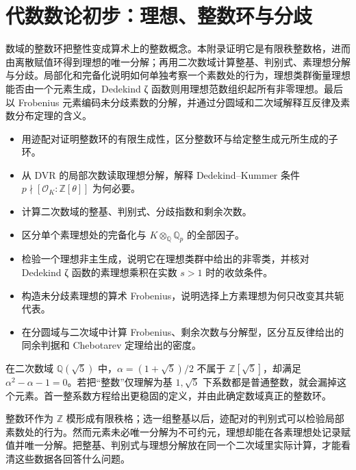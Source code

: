 
\chapter{代数数论初步：理想、整数环与分歧}
\label{b3:app:A}

\begin{chapterabstract}
	数域的整数环把整性变成算术上的整数概念。本附录证明它是有限秩整数格，进而由离散赋值环得到理想的唯一分解；再用二次数域计算整基、判别式、素理想分解与分歧。局部化和完备化说明如何单独考察一个素数处的行为，理想类群衡量理想能否由一个元素生成，Dedekind ζ 函数则用理想范数组织起所有非零理想。最后以 Frobenius 元素编码未分歧素数的分解，并通过分圆域和二次域解释互反律及素数分布定理的含义。
\end{chapterabstract}

\begin{learninggoals}
	\begin{itemize}
		\item 用迹配对证明整数环的有限生成性，区分整数环与给定整生成元所生成的子环。
		\item 从 DVR 的局部次数读取理想分解，解释 Dedekind--Kummer 条件 \(p\nmid[\mathcal O_K:\mathbb Z[\theta]]\) 为何必要。
		\item 计算二次数域的整基、判别式、分歧指数和剩余次数。
		\item 区分单个素理想处的完备化与 \(K\otimes_{\mathbb Q}\mathbb Q_p\) 的全部因子。
		\item 检验一个理想非主生成，说明它在理想类群中给出的非零类，并核对 Dedekind ζ 函数的素理想乘积在实数 \(s>1\) 时的收敛条件。
		\item 构造未分歧素理想的算术 Frobenius，说明选择上方素理想为何只改变其共轭代表。
		\item 在分圆域与二次域中计算 Frobenius、剩余次数与分解型，区分互反律给出的同余判据和 Chebotarev 定理给出的密度。
	\end{itemize}
\end{learninggoals}

在二次数域 \(\mathbb Q(\sqrt5)\) 中，\(\alpha=(1+\sqrt5)/2\) 不属于 \(\mathbb Z[\sqrt5]\)，却满足 \(\alpha^2-\alpha-1=0\)。若把“整数”仅理解为基 \(1,\sqrt5\) 下系数都是普通整数，就会漏掉这个元素。首一整系数方程给出更稳固的定义，并由此确定数域真正的整数环。

\ProseParagraphBreak

整数环作为 \(\mathbb Z\) 模形成有限秩格；选一组整基以后，迹配对的判别式可以检验局部素数处的行为。然而元素未必唯一分解为不可约元，理想却能在各素理想处记录赋值并唯一分解。把整基、判别式与理想分解放在同一个二次域里实际计算，才能看清这些数据各回答什么问题。

